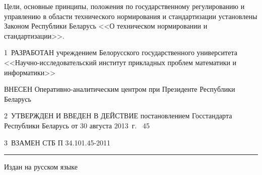 Цели, основные принципы, положения по государственному регулированию и 
управлению в области технического нормирования и стандартизации 
установлены Законом Республики Беларусь <<О техническом нормировании и 
стандартизации>>.  

\vskip0.2cm

1~РАЗРАБОТАН учреждением Белорусского государственного университета 
<<Науч\-но-исследовательский  институт прикладных проблем математики и 
информатики>> 

ВНЕСЕН Оперативно-аналитическим центром при Президенте Республики Беларусь 

2~УТВЕРЖДЕН И ВВЕДЕН В ДЕЙСТВИЕ постановлением Госстандарта Республики 
Беларусь от 30 августа 2013~г. \No~45

3~ВЗАМЕН СТБ П 34.101.45-2011

\vfill
\hrule
\vskip1mm
Издан на русском языке

\pagebreak

